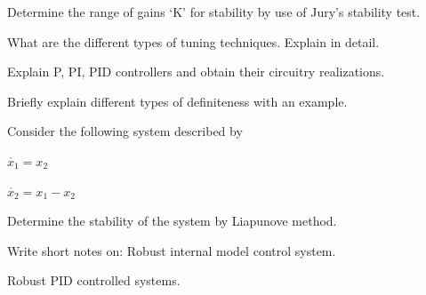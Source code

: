   Determine the range of gains `K' for stability by use of Jury's stability test.
\ene

\item \iitem What are the different types of tuning techniques. Explain in detail.
\Or
\item Explain P, PI, PID controllers and obtain their circuitry realizations.
\ene

\item \iitem \iitem Briefly explain different types of definiteness with an example.
\item Consider the following system described by

  \hspace{1cm} $\mathring{x_1} = x_2$

  \hspace{1cm} $\mathring{x_2} = x_1 - x_2$

  Determine the stability of the system by Liapunove method.
\ene
\Or
\item Write short notes on:
\iitem Robust internal model control system.
\item Robust PID controlled systems.
\ene
\ene

\markC
\ene
